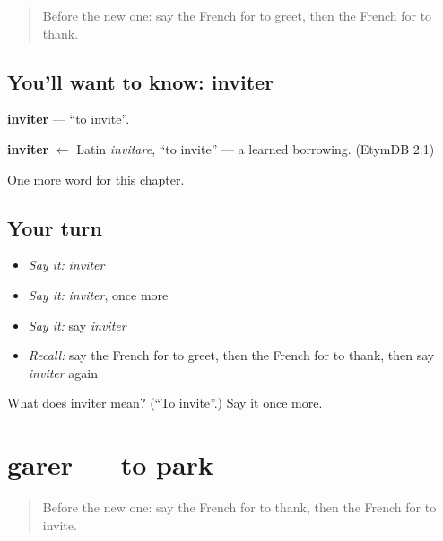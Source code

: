 \label{lesson:FR-C175-inviter}



\begin{quote}
Before the new one: say the French for to greet, then the French for to thank.
\end{quote}

\subsection*{You'll want to know: inviter}
\textbf{inviter} — \textquotedblleft{}to invite\textquotedblright{}.

\begin{cousinweb}
\textbf{inviter} $\leftarrow$ Latin \emph{invitare}, \textquotedblleft{}to invite\textquotedblright{} — a learned borrowing. (EtymDB 2.1)
\end{cousinweb}

\begin{grammarlens}[title={What you've built}]
One more word for this chapter.
\end{grammarlens}

\subsection*{Your turn}
\begin{itemize}
\raggedright
  \item \emph{Say it:} \emph{inviter}
  \item \emph{Say it:} \emph{inviter}, once more
  \item \emph{Say it:} say \emph{inviter}
  \item \emph{Recall:} say the French for to greet, then the French for to thank, then say \emph{inviter} again
\end{itemize}

\begin{tcolorbox}[breakable,colback=teal!4,colframe=teal!35!black,title={Before you move on}]
What does inviter mean? (\textquotedblleft{}To invite\textquotedblright{}.) Say it once more.
\end{tcolorbox}
\section[garer]{garer — to park}

\label{lesson:FR-C175-garer}



\begin{quote}
Before the new one: say the French for to thank, then the French for to invite.
\end{quote}

